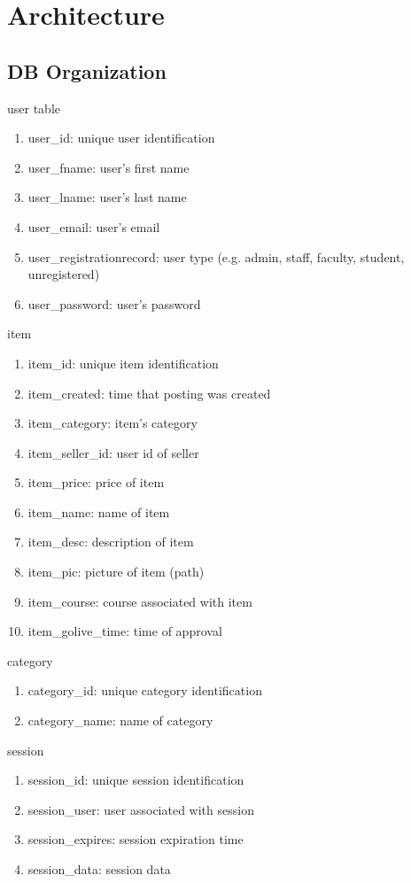 \section{Architecture}

\subsection{DB Organization}

{\large user table}
\begin{enumerate}
\item user\_id: unique user identification
\item user\_fname: user's first name
\item user\_lname: user's last name
\item user\_email: user's email
\item user\_registrationrecord: user type (e.g. admin, staff, faculty, student, unregistered)
\item user\_password: user's password
\end{enumerate}%
%
{\large item}
\begin{enumerate}
\item item\_id: unique item identification
\item item\_created: time that posting was created
\item item\_category: item's category
\item item\_seller\_id: user id of seller
\item item\_price: price of item
\item item\_name: name of item
\item item\_desc: description of item
\item item\_pic: picture of item (path)
\item item\_course: course associated with item
\item item\_golive\_time: time of approval 
\end{enumerate}%
%
{\large category}
\begin{enumerate}
\item category\_id: unique category identification
\item category\_name: name of category
\end{enumerate}
%
{\large session}
\begin{enumerate}
\item session\_id: unique session identification
\item session\_user: user associated with session
\item session\_expires: session expiration time
\item session\_data: session data
\end{enumerate}%
